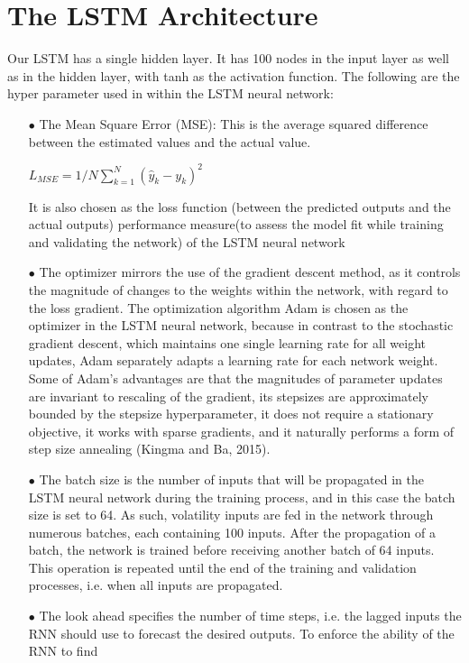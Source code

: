 \documentclass[a4paper,11pt,oneside]{book}
\begin{document}
\section{The LSTM Architecture}
Our LSTM has a single hidden layer. It has 100 nodes in the input layer as well as in the hidden layer, with tanh as the activation function. The following are the hyper parameter used in within the LSTM neural network:
\begin{itemize}
\item[$\bullet$] The Mean Square Error (MSE): This is the average squared difference between the estimated values and the actual value.

\begin{center}
	$L_{MSE} = 1/N\sum_{k=1}^{N} ({\hat{y}}_{k}-y_k)^2$
\end{center}
 It is also chosen as the loss function (between the predicted outputs and the actual outputs) performance measure(to assess the model fit while
training and validating the network) of the
LSTM neural network
\item[$\bullet$]   The optimizer mirrors the use of the gradient descent method, as it controls the
magnitude of changes to the weights within the network, with regard to the
loss gradient. The optimization algorithm Adam is chosen as the optimizer in
the LSTM neural network, because in contrast to the stochastic gradient
descent, which maintains one single learning rate for all weight updates, Adam
separately adapts a learning rate for each network weight. Some of Adam’s advantages are that the magnitudes of parameter updates are invariant to
rescaling of the gradient, its stepsizes are approximately bounded by the stepsize hyperparameter,
it does not require a stationary objective, it works with sparse gradients, and it naturally performs a
form of step size annealing (Kingma and Ba, 2015).
\item[$\bullet$] The batch size is the number of inputs that will be propagated in the
LSTM neural network during the training process, and in this case the batch
size is set to 64. As such, volatility inputs are
fed in the network through numerous batches, each containing 100 inputs. After
the propagation of a batch, the network is trained before receiving another
batch of 64 inputs. This operation is repeated until the end of the training and
validation processes, i.e. when all inputs are propagated.
\item[$\bullet$] The look ahead specifies the number of time steps, i.e. the lagged
inputs the RNN should use to forecast the desired outputs. To enforce the ability of the RNN to find

\end{itemize}
\end{document}
